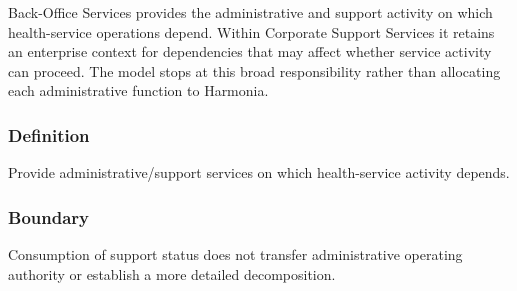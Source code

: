 Back-Office Services provides the administrative and support activity on which health-service operations depend. Within Corporate Support Services it retains an enterprise context for dependencies that may affect whether service activity can proceed. The model stops at this broad responsibility rather than allocating each administrative function to Harmonia.

\subsubsection*{Definition}

Provide administrative/\allowbreak{}support services on which health-service activity depends.

\subsubsection*{Boundary}

Consumption of support status does not transfer administrative operating authority or establish a more detailed decomposition.

